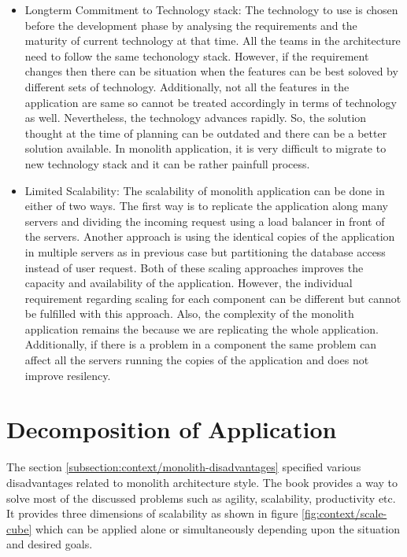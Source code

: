 \begin{itemize}[leftmargin=.5in]
\\
\item Longterm Commitment to Technology stack: The technology to use is chosen before the development phase by analysing the requirements and the maturity of current technology at that time. All the teams in the architecture need to follow the same techonology stack. However, if the requirement changes then there can be situation when the features can be best soloved by different sets of technology. Additionally, not all the features in the application are same so cannot be treated accordingly in terms of technology as well. Nevertheless, the technology advances rapidly. So, the solution thought at the time of planning can be outdated and there can be a better solution available. In monolith application, it is very difficult to migrate to new technology stack and it can be rather painfull process.
\\
\item Limited Scalability: The scalability of monolith application can be done in either of two ways. The first way is to replicate the application along many servers and dividing the incoming request using a load balancer in front of the servers. Another approach is using the identical copies of the application in multiple servers as in previous case but partitioning the database access instead of user request. Both of these scaling approaches improves the capacity and availability of the application. However, the individual requirement regarding scaling for each component can be different but cannot be fulfilled with this approach. Also, the complexity of the monolith application remains the because we are replicating the whole application. Additionally, if there is a problem in a component the same problem can affect all the servers running the copies of the application and does not improve resilency.\cite{MacVittie:2014aa}\cite{Namiot:2014aa}
\end{itemize}

\section{Decomposition of Application}\label{section:context/decompostion-of-application}
The section \ref{subsection:context/monolith-disadvantages} specified various disadvantages related to monolith architecture style. The book \cite{Fisher:2015aa} provides a way to solve most of the discussed problems such as agility, scalability, productivity etc. It provides three dimensions of scalability as shown in figure \ref{fig:context/scale-cube} which can be applied alone or simultaneously depending upon the situation and desired goals.


